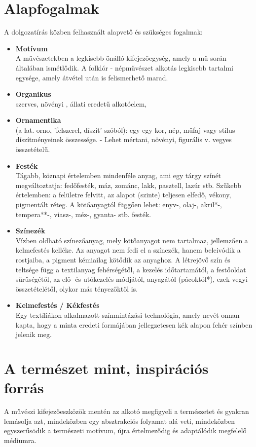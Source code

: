 \section{Alapfogalmak}
A dolgozatírás közben felhasznált alapvető és szükséges fogalmak:
\begin{itemize}
	\item \textbf{Motívum} \\  A művészetekben a legkisebb önálló kifejezőegység, amely a mű során általában ismétlődik. A folklór - népművészet alkotás legkisebb tartalmi egysége, amely átvétel után is felismerhető marad.
	\item \textbf{Organikus} \\ szerves, növényi , állati eredetű alkotóelem, 
	\item \textbf{Ornamentika} \\ (a lat. orno, 'felszerel, díszít' szóból): egy-egy kor, nép, műfaj vagy stílus díszítményeinek összessége. - Lehet mértani, növényi, figurális v. vegyes összetételű.
	\item \textbf{Festék} \\ Tágabb, köznapi értelemben mindenféle anyag, ami egy tárgy színét megváltoztatja: fedőfesték, máz, zománc, lakk, pasztell, lazúr stb. Szűkebb értelemben: a felületre felvitt, az alapot (szinte) teljesen elfedő, vékony, pigmentált réteg. A kötőanyagtól függően lehet: enyv-, olaj-, akril*-, tempera**-, viasz-, méz-, gyanta- stb. festék.
	\item \textbf{Színezék} \\
	Vízben oldható színezőanyag, mely kötőanyagot nem tartalmaz, jellemzően a kelmefestés kelléke. Az anyagot nem fedi el a színezék, hanem beleivódik a rostjaiba, a pigment kémiailag kötődik az anyaghoz. A létrejövő szín és teltsége függ a textilanyag fehérségétől, a kezelés időtartamától, a festőoldat sűrűségétől, az elő- és utókezelés módjától, anyagától (pácoktól*), ezek vegyi összetételétől, olykor más tényezőktől is.
	\item \textbf{Kelmefestés / Kékfestés} \\ 
	Egy textíliákon alkalmazott színmintázási technológia, amely nevét onnan kapta, hogy a minta eredeti formájában jellegzetesen kék alapon fehér színben jelenik meg.
	\end{itemize}

\section{A természet mint, inspirációs forrás}
A művészi kifejezőeszközök mentén az alkotó megfigyeli a természetet és gyakran lemásolja azt, mindeközben egy absztrakciós folyamat alá veti, mindeközben egyszerűsödik a természeti motívum, újra értelmeződig és adaptálódik megfelelő médiumra.

